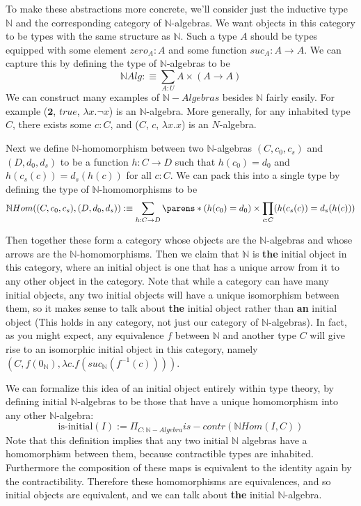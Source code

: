 \documentclass[11pt]{article}
\newcommand{\N}{\mathbb{N}}
\newcommand{\2}{\textbf{2}}
\begin{document}
To make these abstractions more concrete, we'll consider just the inductive type $\N$ and the corresponding category of $\N$-algebras.
We want objects in this category to be types with the same structure as $\N$.
Such a type $A$ should be types equipped with some element $zero_A : A$ and some function $suc_A : A \rightarrow A$.
We can capture this by defining the type of $\N$-algebras to be
\begin{equation*}
  \N Alg :\equiv \sum_{A : U} A \times (A \rightarrow A)
\end{equation*}
We can construct many examples of $\N-Algebras$ besides $\N$ fairly easily.
For example ($\2$, $true$, $\lambda x . \neg x$) is an $\N$-algebra.
More generally, for any inhabited type $C$, there exists some $c : C$, and  ($C$, $c$, $\lambda x . x$) is an $N$-algebra.

Next we define $\N$-homomorphism between two $\N$-algebras $(C, c_0, c_s)$ and $(D, d_0, d_s)$ to be a function $h: C \rightarrow D$ such that $h(c_0) = d_0$ and $h(c_s(c)) = d_s(h(c))$ for all $c : C$. We can pack this into a single type by defining the type of $\N$-homomorphisms to be
\begin{equation*}
  \N Hom((C,c_0,c_s), (D,d_0,d_s)) :\equiv \sum_{h : C \rightarrow D}\parens*{(h(c_0)=d_0) \times \prod_{c : C} (h(c_s(c))=d_s(h(c)))}
\end{equation*}

Then together these form a category whose objects are the $\N$-algebras and whose arrows are the $\N$-homomorphisms.
Then we claim that $\N$ is \textbf{the} initial object in this category, where an initial object is one that has a unique arrow from it to any other object in the category.
Note that while a category can have many initial objects, any two initial objects will have a unique isomorphism between them, so it makes sense to talk about \textbf{the} initial object rather than \textbf{an} initial object (This holds in any category, not just our category of $\N$-algebras).
In fact, as you might expect, any equivalence $f$ between $\N$ and another type $C$ will give rise to an isomorphic initial object in this category, namely $(C, f(0_\N), \lambda c . f(suc_\N(f^{-1}(c))))$.

We can formalize this idea of an initial object entirely within type theory, by defining initial $\N$-algebras to be those that have a unique homomorphism into any other $\N$-algebra: 
\begin{equation*}
  \text{is-initial}(I) := \Pi_{C : \N-Algebra} is-contr (\N Hom(I, C))
\end{equation*}
Note that this definition implies that any two initial $\N$ algebras have a homomorphism between them, because contractible types are inhabited.
Furthermore the composition of these maps is equivalent to the identity again by the contractibility.
Therefore these homomorphisms are equivalences, and so initial objects are equivalent, and we can talk about \textbf{the} initial $\N$-algebra.
\end{document}
